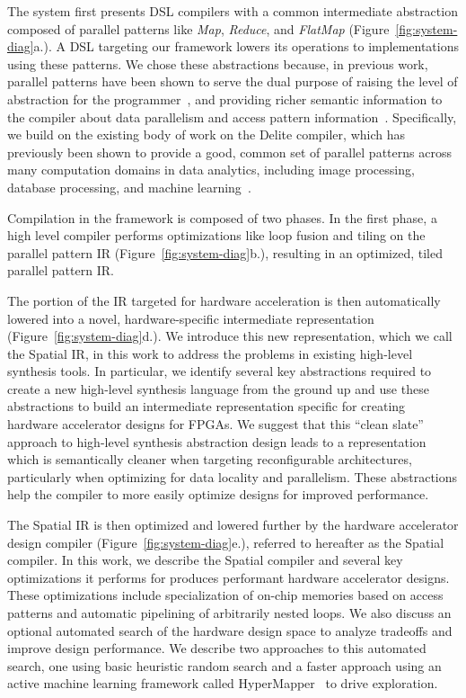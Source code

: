 The system first presents DSL compilers with a common intermediate abstraction composed of
parallel patterns like \emph{Map}, \emph{Reduce}, and \emph{FlatMap} (Figure~\ref{fig:system-diag}a.).
A DSL targeting our framework lowers its operations to implementations using these patterns.
We chose these abstractions because, in previous work, parallel patterns have
been shown to serve the dual purpose of raising the
level of abstraction for the
programmer~\cite{ecoop13sujeeth,pldi13halide}, and providing richer
semantic information to the compiler about data parallelism
and access pattern information~\cite{delite-tecs14}.
Specifically, we build on the existing body of work
on the Delite compiler, which has previously been shown
to provide a good, common set of parallel patterns across many computation domains in data analytics, including
image processing, database processing, and machine learning~\cite{pldi13halide,ecoop13sujeeth}.

Compilation in the framework is composed of two phases. In the first phase,
a high level compiler performs optimizations like loop fusion and tiling
on the parallel pattern IR (Figure~\ref{fig:system-diag}b.), resulting in an
optimized, tiled parallel pattern IR.

The portion of the IR targeted for hardware acceleration is then automatically
lowered into a novel, hardware-specific intermediate
representation (Figure~\ref{fig:system-diag}d.).
We introduce this new representation, which we call the Spatial IR,
in this work to address the problems in existing
high-level synthesis tools. In particular, we identify several key
abstractions required to create a new high-level synthesis language from the
ground up and use these abstractions to build an intermediate representation
specific for creating hardware accelerator designs for FPGAs.
We suggest that this ``clean slate'' approach to high-level synthesis abstraction
design leads to a representation which is semantically cleaner when targeting
reconfigurable architectures, particularly when optimizing for data locality and parallelism.
These abstractions help the compiler to more easily optimize designs for improved performance.

The Spatial IR is then optimized and lowered further by the hardware accelerator design compiler (Figure~\ref{fig:system-diag}e.), referred to hereafter as the Spatial compiler.
In this work, we describe the Spatial compiler and several key optimizations it
performs for produces performant hardware accelerator designs.
These optimizations include specialization of on-chip memories based on access patterns and
automatic pipelining of arbitrarily nested loops.
We also discuss an optional automated search of the hardware design space
to analyze tradeoffs and improve design performance.
We describe two approaches to this automated search, one using basic heuristic random
search and a faster approach using an active machine learning framework called
HyperMapper~\cite{Bodin2016:PACT16} to drive exploration.

